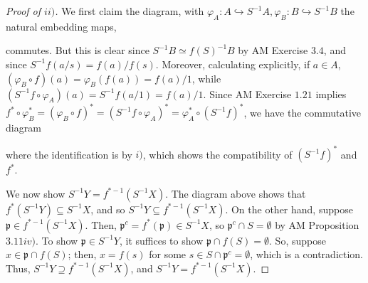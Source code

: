 \documentclass[12pt,letterpaper]{article}
\theoremstyle{definition}
\theoremstyle{remark}
\numberwithin{figure}{problem}
\numberwithin{equation}{section}
\DeclareMathOperator{\Spec}{Spec}
\begin{document}
\begin{proof}[Proof of $ii)$]
  We first claim the diagram, with $\varphi_A : A \hookrightarrow S^{-1}A, \varphi_B : B \hookrightarrow S^{-1}B$ the natural embedding maps,
  \begin{center}
  \end{center}
  commutes. But this is clear since $S^{-1}B \simeq f(S)^{-1}B$ by AM Exercise $3.4$, and since $S^{-1}f(a/s) = f(a)/f(s)$. Moreover, calculating explicitly, if $a \in A$, $(\varphi_B \circ f) (a) = \varphi_B (f(a)) = f(a)/1$, while $(S^{-1}f \circ \varphi_A)(a) = S^{-1}f (a/1) = f(a)/1$. Since AM Exercise $1.21$ implies $f^* \circ \varphi_B^* = (\varphi_B \circ f)^* = (S^{-1}f \circ \varphi_A)^* = \varphi_A^* \circ (S^{-1}f)^*$, we have the commutative diagram
  \begin{center}
  \end{center}
  where the identification is by $i)$, which shows the compatibility of $(S^{-1}f)^*$ and $f^*$.
  \par We now show $S^{-1}Y = f^{*-1}(S^{-1}X)$. The diagram above shows that $f^*(S^{-1}Y) \subseteq S^{-1}X$, and so $S^{-1}Y \subseteq f^{*-1}(S^{-1}X)$. On the other hand, suppose $\mathfrak{p} \in f^{*-1}(S^{-1}X)$. Then, $\mathfrak{p}^c = f^*(\mathfrak{p}) \in S^{-1}X$, so $\mathfrak{p}^c \cap S = \emptyset$ by AM Proposition $3.11iv)$. To show $\mathfrak{p} \in S^{-1}Y$, it suffices to show $\mathfrak{p} \cap f(S) = \emptyset$. So, suppose $x \in \mathfrak{p} \cap f(S)$; then, $x = f(s)$ for some $s \in S \cap \mathfrak{p}^c = \emptyset$, which is a contradiction. Thus, $S^{-1}Y \supseteq f^{*-1}(S^{-1}X)$, and $S^{-1}Y = f^{*-1}(S^{-1}X)$.
\end{proof}
\end{document}
